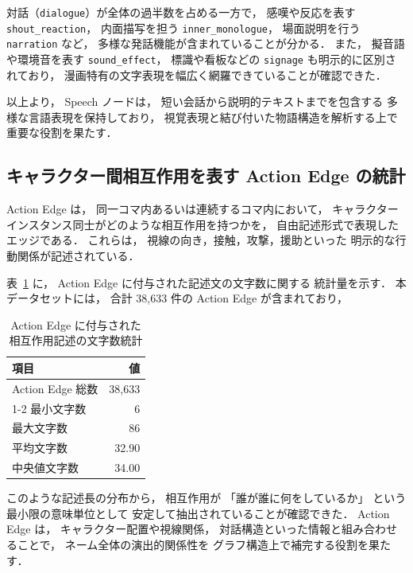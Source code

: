 \documentclass[a4j,12pt,dvipdfmx]{jsreport}
\begin{document}
対話（\texttt{dialogue}）が全体の過半数を占める一方で，
感嘆や反応を表す \texttt{shout\_reaction}，
内面描写を担う \texttt{inner\_monologue}，
場面説明を行う \texttt{narration} など，
多様な発話機能が含まれていることが分かる．
また，
擬音語や環境音を表す \texttt{sound\_effect}，
標識や看板などの \texttt{signage} も明示的に区別されており，
漫画特有の文字表現を幅広く網羅できていることが確認できた．

以上より，
Speech ノードは，
短い会話から説明的テキストまでを包含する
多様な言語表現を保持しており，
視覚表現と結び付いた物語構造を解析する上で
重要な役割を果たす．

\subsection{キャラクター間相互作用を表す Action Edge の統計}
\label{sec:action_edge_stats}

Action Edge は，
同一コマ内あるいは連続するコマ内において，
キャラクターインスタンス同士がどのような相互作用を持つかを，
自由記述形式で表現したエッジである．
これらは，
視線の向き，接触，攻撃，援助といった
明示的な行動関係が記述されている．

表~\ref{tab:action_edge_length_stats} に，
Action Edge に付与された記述文の文字数に関する
統計量を示す．
本データセットには，
合計 38{,}633 件の Action Edge が含まれており，

\begin{table}[htbp]
   \centering
   \caption{Action Edge に付与された相互作用記述の文字数統計}
   \label{tab:action_edge_length_stats}
   \begin{tabular}{lr}
      \toprule
      \textbf{項目}    & \textbf{値} \\
      \midrule
      Action Edge 総数 & 38{,}633   \\
      \cmidrule(lr){1-2}
      最小文字数          & 6          \\
      最大文字数          & 86         \\
      平均文字数          & 32.90      \\
      中央値文字数         & 34.00      \\
      \bottomrule
   \end{tabular}
\end{table}

このような記述長の分布から，
相互作用が
「誰が誰に何をしているか」
という最小限の意味単位として
安定して抽出されていることが確認できた．
Action Edge は，
キャラクター配置や視線関係，
対話構造といった情報と組み合わせることで，
ネーム全体の演出的関係性を
グラフ構造上で補完する役割を果たす．
\end{document}
